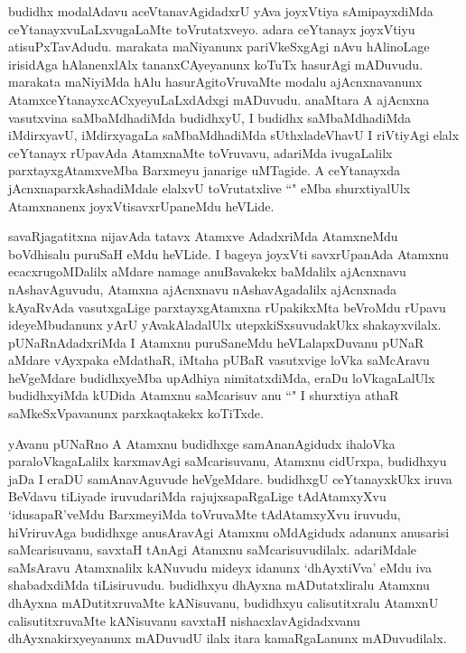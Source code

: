 \begin{artha}
budidhx modalAdavu aceVtanavAgidadxrU yAva joyxVtiya sAmipayxdiMda ceYtanayxvuLaLxvugaLaMte toVrutatxveyo. adara ceYtanayx joyxVtiyu atisuPxTavAdudu. marakata maNiyanunx pariVkeSxgAgi nAvu hAlinoLage irisidAga hAlanenxlAlx tananxCAyeyanunx koTuTx hasurAgi mADuvudu. marakata maNiyiMda hAlu hasurAgitoVruvaMte modalu ajAcnxnavanunx AtamxceYtanayxcACxyeyuLaLxdAdxgi mADuvudu. anaMtara A ajAcnxna vasutxvina saMbaMdhadiMda budidhxyU, I budidhx saMbaMdhadiMda iMdirxyavU, iMdirxyagaLa saMbaMdhadiMda sUthxladeVhavU I riVtiyAgi elalx ceYtanayx rUpavAda AtamxnaMte toVruvavu, adariMda ivugaLalilx parxtayxgAtamxveMba Barxmeyu janarige uMTagide. A ceYtanayxda jAcnxnaparxkAshadiMdale elalxvU toVrutatxlive ``\stext " eMba shurxtiyalUlx Atamxnanenx joyxVtisavxrUpaneMdu heVLide. 
\end{artha}


\begin{artha}
savaRjagatitxna nijavAda tatavx Atamxve AdadxriMda AtamxneMdu boVdhisalu puruSaH eMdu heVLide. I bageya joyxVti savxrUpanAda Atamxnu ecacxrugoMDalilx aMdare namage anuBavakekx baMdalilx ajAcnxnavu nAshavAguvudu, Atamxna ajAcnxnavu nAshavAgadalilx ajAcnxnada kAyaRvAda vasutxgaLige parxtayxgAtamxna rUpakikxMta beVroMdu rUpavu ideyeMbudanunx yArU yAvakAladalUlx utepxkiSxsuvudakUkx shakayxvilalx. pUNaRnAdadxriMda I Atamxnu puruSaneMdu heVLalapxDuvanu pUNaR aMdare vAyxpaka eMdathaR, iMtaha pUBaR vasutxvige loVka saMcAravu heVgeMdare budidhxyeMba upAdhiya nimitatxdiMda, eraDu loVkagaLalUlx budidhxyiMda kUDida Atamxnu saMcarisuv
anu ``\stext " I shurxtiya athaR saMkeSxVpavanunx parxkaqtakekx koTiTxde.
\end{artha}%



\begin{artha}
yAvanu pUNaRno A Atamxnu budidhxge samAnanAgidudx ihaloVka paraloVkagaLalilx karxmavAgi saMcarisuvanu, Atamxnu cidUrxpa, budidhxyu jaDa I eraDU samAnavAguvude heVgeMdare. budidhxgU ceYtanayxkUkx iruva BeVdavu tiLiyade iruvudariMda rajujxsapaRgaLige tAdAtamxyXvu `idusapaR'veMdu BarxmeyiMda toVruvaMte tAdAtamxyXvu iruvudu, hiVriruvAga budidhxge anusAravAgi Atamxnu oMdAgidudx adanunx anusarisi saMcarisuvanu, savxtaH tAnAgi Atamxnu saMcarisuvudilalx. adariMdale saMsAravu Atamxnalilx kANuvudu mideyx idanunx `dhAyxtiVva' eMdu iva shabadxdiMda tiLisiruvudu. budidhxyu dhAyxna mADutatxliralu Atamxnu dhAyxna mADutitxruvaMte kANisuvanu, budidhxyu calisutitxralu AtamxnU calisutitxruvaMte kANisuvanu savxtaH nishacxlavAgidadxvanu dhAyxnakirxyeyanunx mADuvudU ilalx itara kamaRgaLanunx mADuvudilalx. 
\end{artha}

